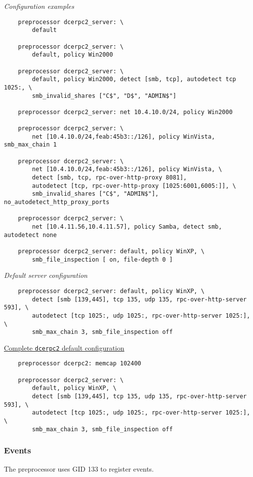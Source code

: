 \documentclass[english]{report}
\begin{document}
\textit{Configuration examples}
\footnotesize
\begin{verbatim}
    preprocessor dcerpc2_server: \
        default

    preprocessor dcerpc2_server: \
        default, policy Win2000

    preprocessor dcerpc2_server: \
        default, policy Win2000, detect [smb, tcp], autodetect tcp 1025:, \
        smb_invalid_shares ["C$", "D$", "ADMIN$"]

    preprocessor dcerpc2_server: net 10.4.10.0/24, policy Win2000

    preprocessor dcerpc2_server: \
        net [10.4.10.0/24,feab:45b3::/126], policy WinVista, smb_max_chain 1

    preprocessor dcerpc2_server: \
        net [10.4.10.0/24,feab:45b3::/126], policy WinVista, \
        detect [smb, tcp, rpc-over-http-proxy 8081], 
        autodetect [tcp, rpc-over-http-proxy [1025:6001,6005:]], \
        smb_invalid_shares ["C$", "ADMIN$"], no_autodetect_http_proxy_ports

    preprocessor dcerpc2_server: \
        net [10.4.11.56,10.4.11.57], policy Samba, detect smb, autodetect none

    preprocessor dcerpc2_server: default, policy WinXP, \
        smb_file_inspection [ on, file-depth 0 ]
\end{verbatim}
\normalsize

\textit{Default server configuration}
\footnotesize
\begin{verbatim}
    preprocessor dcerpc2_server: default, policy WinXP, \
        detect [smb [139,445], tcp 135, udp 135, rpc-over-http-server 593], \
        autodetect [tcp 1025:, udp 1025:, rpc-over-http-server 1025:], \
        smb_max_chain 3, smb_file_inspection off
\end{verbatim}
\normalsize

\underline{Complete \texttt{dcerpc2} default configuration}
\footnotesize
\begin{verbatim}
    preprocessor dcerpc2: memcap 102400

    preprocessor dcerpc2_server: \
        default, policy WinXP, \
        detect [smb [139,445], tcp 135, udp 135, rpc-over-http-server 593], \
        autodetect [tcp 1025:, udp 1025:, rpc-over-http-server 1025:], \
        smb_max_chain 3, smb_file_inspection off
\end{verbatim}
\normalsize

\subsubsection{Events}
The preprocessor uses GID 133 to register events.\\
\end{document}
